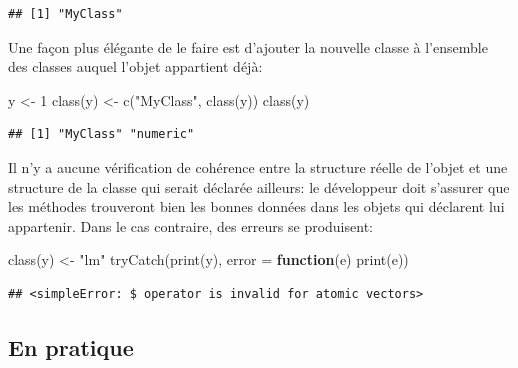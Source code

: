 \documentclass[
  11pt,
  french,
  a4paper,
  extrafontsizes,onecolumn,openright
  ]{memoir}
\newenvironment{Shaded}{\begin{snugshade}}{\end{snugshade}}
\newcommand{\AttributeTok}[1]{\textcolor[rgb]{0.77,0.63,0.00}{#1}}
\newcommand{\ControlFlowTok}[1]{\textcolor[rgb]{0.13,0.29,0.53}{\textbf{#1}}}
\newcommand{\DecValTok}[1]{\textcolor[rgb]{0.00,0.00,0.81}{#1}}
\newcommand{\FunctionTok}[1]{\textcolor[rgb]{0.00,0.00,0.00}{#1}}
\newcommand{\NormalTok}[1]{#1}
\newcommand{\OtherTok}[1]{\textcolor[rgb]{0.56,0.35,0.01}{#1}}
\newcommand{\StringTok}[1]{\textcolor[rgb]{0.31,0.60,0.02}{#1}}
\begin{document}
\begin{verbatim}
## [1] "MyClass"
\end{verbatim}

\normalsize
Une façon plus élégante de le faire est d'ajouter la nouvelle classe à l'ensemble des classes auquel l'objet appartient déjà:

\scriptsize

\begin{Shaded}
\begin{Highlighting}[]
\NormalTok{y }\OtherTok{\textless{}{-}} \DecValTok{1}
\FunctionTok{class}\NormalTok{(y) }\OtherTok{\textless{}{-}} \FunctionTok{c}\NormalTok{(}\StringTok{"MyClass"}\NormalTok{, }\FunctionTok{class}\NormalTok{(y))}
\FunctionTok{class}\NormalTok{(y)}
\end{Highlighting}
\end{Shaded}

\begin{verbatim}
## [1] "MyClass" "numeric"
\end{verbatim}

\normalsize

Il n'y a aucune vérification de cohérence entre la structure réelle de l'objet et une structure de la classe qui serait déclarée ailleurs: le développeur doit s'assurer que les méthodes trouveront bien les bonnes données dans les objets qui déclarent lui appartenir.
Dans le cas contraire, des erreurs se produisent:

\scriptsize

\begin{Shaded}
\begin{Highlighting}[]
\FunctionTok{class}\NormalTok{(y) }\OtherTok{\textless{}{-}} \StringTok{"lm"}
\FunctionTok{tryCatch}\NormalTok{(}\FunctionTok{print}\NormalTok{(y), }\AttributeTok{error =} \ControlFlowTok{function}\NormalTok{(e) }\FunctionTok{print}\NormalTok{(e))}
\end{Highlighting}
\end{Shaded}

\begin{verbatim}
## <simpleError: $ operator is invalid for atomic vectors>
\end{verbatim}

\normalsize

\hypertarget{en-pratique}{%
\subsection{En pratique}\label{en-pratique}}
\end{document}
